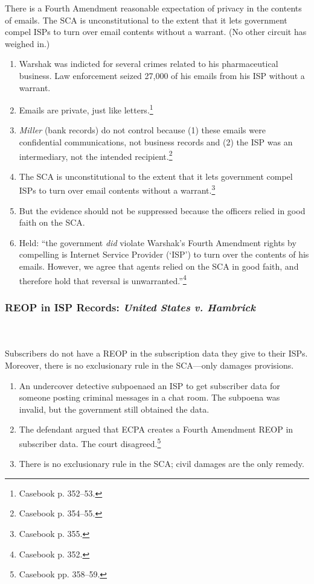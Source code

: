 There is a Fourth Amendment reasonable expectation of privacy in the contents 
of emails. The SCA is unconstitutional to the extent that it lets government 
compel ISPs to turn over email contents without a warrant. (No other circuit 
has weighed in.)

\begin{enumerate}
    \item Warshak was indicted for several crimes related to his 
    pharmaceutical business. Law enforcement seized 27,000 of his emails from 
    his ISP without a warrant.
    \item Emails are private, just like letters.\footnote{Casebook p. 352--53.}
    \item \emph{Miller} (bank records) do not control because (1) these emails 
    were confidential communications, not business records and (2) the ISP was 
    an intermediary, not the intended recipient.\footnote{Casebook p. 354--55.}
    \item The SCA is unconstitutional to the extent that it lets government 
    compel ISPs to turn over email contents without a 
    warrant.\footnote{Casebook p. 355.}
    \item But the evidence should not be suppressed because the officers 
    relied in good faith on the SCA.
    \item Held: ``the government \emph{did} violate Warshak's Fourth Amendment 
    rights by compelling is Internet Service Provider (`ISP') to turn over the 
    contents of his emails. However, we agree that agents relied on the SCA in 
    good faith, and therefore hold that reversal is 
    unwarranted.''\footnote{Casebook p. 352.}
\end{enumerate}

\subsubsection{REOP in ISP Records: \emph{United States v. Hambrick}}
~\\\\
Subscribers do not have a REOP in the subscription data they give to their 
ISPs. Moreover, there is no exclusionary rule in the SCA---only damages 
provisions.

\begin{enumerate}
    \item An undercover detective subpoenaed an ISP to get subscriber data for 
    someone posting criminal messages in a chat room. The subpoena was 
    invalid, but the government still obtained the data.
    \item The defendant argued that ECPA creates a Fourth Amendment REOP in 
    subscriber data. The court disagreed.\footnote{Casebook pp. 358--59.}
    \item There is no exclusionary rule in the SCA; civil damages are the only 
    remedy.
\end{enumerate}

